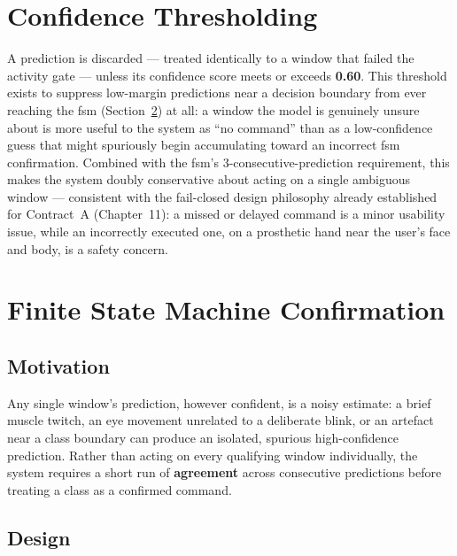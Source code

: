 \section{Confidence Thresholding}
\label{sec:inf_confidence}

A prediction is discarded --- treated identically to a window that
failed the activity gate --- unless its confidence score meets or
exceeds \textbf{0.60}. This threshold exists to suppress low-margin
predictions near a decision boundary from ever reaching the
\acrshort{fsm} (Section~\ref{sec:inf_fsm}) at all: a window the
model is genuinely unsure about is more useful to the system as ``no
command'' than as a low-confidence guess that might spuriously
begin accumulating toward an incorrect \acrshort{fsm} confirmation.
Combined with the \acrshort{fsm}'s 3-consecutive-prediction
requirement, this makes the system doubly conservative about acting
on a single ambiguous window --- consistent with the fail-closed
design philosophy already established for Contract~A
(Chapter~11): a missed or delayed command is a minor usability
issue, while an incorrectly executed one, on a prosthetic hand near
the user's face and body, is a safety concern.

\section{Finite State Machine Confirmation}
\label{sec:inf_fsm}

\subsection{Motivation}

Any single window's prediction, however confident, is a noisy
estimate: a brief muscle twitch, an eye movement unrelated to a
deliberate blink, or an artefact near a class boundary can produce
an isolated, spurious high-confidence prediction. Rather than
acting on every qualifying window individually, the system requires
a short run of \textbf{agreement} across consecutive predictions
before treating a class as a confirmed command.

\subsection{Design}

